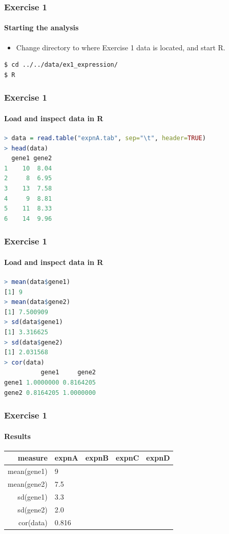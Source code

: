 \documentclass[table]{beamer}
\begin{document}
  \begin{frame}[fragile]
    \frametitle{Exercise 1}
    \framesubtitle{Starting the analysis}
    \begin{itemize}
      \item Change directory to where Exercise 1 data is located, and start R.
    \end{itemize}
    \begin{lstlisting}[language=bash]
$ cd ../../data/ex1_expression/
$ R
    \end{lstlisting}
\end{frame}

  \begin{frame}[fragile]
    \frametitle{Exercise 1}
    \framesubtitle{Load and inspect data in R}
    \begin{lstlisting}[language=R]
> data = read.table("expnA.tab", sep="\t", header=TRUE)
> head(data)
  gene1 gene2
1    10  8.04
2     8  6.95
3    13  7.58
4     9  8.81
5    11  8.33
6    14  9.96
    \end{lstlisting}
\end{frame}

  \begin{frame}[fragile]
    \frametitle{Exercise 1}
    \framesubtitle{Load and inspect data in R}
    \begin{lstlisting}[language=R]
> mean(data$gene1)
[1] 9
> mean(data$gene2)
[1] 7.500909
> sd(data$gene1)
[1] 3.316625
> sd(data$gene2)
[1] 2.031568
> cor(data)
          gene1     gene2
gene1 1.0000000 0.8164205
gene2 0.8164205 1.0000000
    \end{lstlisting}
\end{frame}

  \begin{frame}
    \frametitle{Exercise 1}
    \framesubtitle{Results}
    \begin{center}
	\begin{tabular}{r|l|l|l|l}
	  measure & expnA & expnB & expnC & expnD \\
	  \hline
	  mean(gene1) & 9     &  &  & \\
	  mean(gene2) & 7.5   &  &  & \\
  	  sd(gene1)   & 3.3   &  &  & \\
  	  sd(gene2)   & 2.0   &  &  & \\  
	  cor(data)   & 0.816 &  &  & \\  
	\end{tabular}
    \end{center}
  \end{frame}
\end{document}

